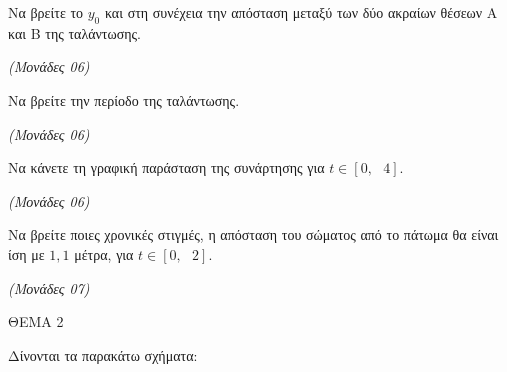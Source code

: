 \documentclass[11pt,a4paper,twoside]{book}
\newcommand{\monades}[1]{\hfill \textit{(Μονάδες #1)}}
\begin{document}
\begin{alist}
\item Να βρείτε το $y_{0}$ και στη συνέχεια την απόσταση μεταξύ των δύο ακραίων θέσεων Α και Β της ταλάντωσης.

\monades{06}

\item Να βρείτε την περίοδο της ταλάντωσης.

\monades{06}

\item Να κάνετε τη γραφική παράσταση της συνάρτησης για $t \in \left\lbrack 0,\text{ }4 \right\rbrack$.

\monades{06}

\item Να βρείτε ποιες χρονικές στιγμές, η απόσταση του σώματος από το πάτωμα θα είναι ίση με $1,1$ μέτρα, για $t \in \left\lbrack 0,\text{ }2 \right\rbrack$.

\monades{07}
\end{alist}

\vspace{4mm}

ΘΕΜΑ 2

Δίνονται τα παρακάτω σχήματα:
\end{document}
